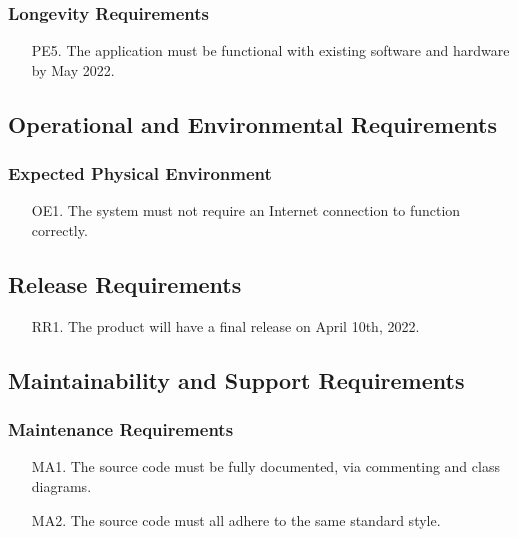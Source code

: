 \documentclass[12pt, titlepage]{article}
\begin{document}
\subsubsection{ Longevity Requirements}

\begin{itemize}
  \item[PE5.] The application must be functional with existing software and hardware by May 2022. 
\end{itemize}

\subsection{Operational and Environmental Requirements}

\subsubsection{ Expected Physical Environment}

\begin{itemize}
  \item[OE1.] The system must not require an Internet connection to function correctly.
\end{itemize}

\subsection{Release Requirements}

\begin{itemize}
  \item[RR1.] The product will have a final release on April 10th, 2022. 
\end{itemize}

\subsection{Maintainability and Support Requirements}

\subsubsection{Maintenance Requirements}

\begin{itemize}
  \item[MA1.] The source code must be fully documented, via commenting and class diagrams. 
  \item[MA2.] The source code must all adhere to the same standard style. 
\end{itemize}
\end{document}
